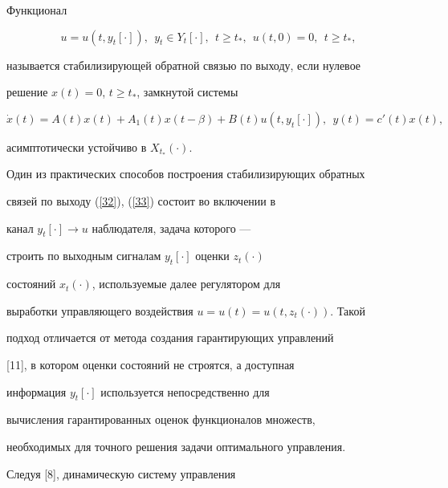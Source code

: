 \begin{defns}


Функционал


\begin{equation}\label{32}


u=u(t,y_t[\cdot]),\ \ y_t \in Y_t[\cdot],


\ \ t \ge t_*,\ \ u(t,0)=0,\ \ t \ge t_*,


\end{equation}


называется стабилизирующей обратной связью по выходу, если нулевое


решение $x(t)=0$, $t \ge t_*$, замкнутой системы


\begin{equation}\label{33}


\Dot x(t)=A(t)x(t)+A_1(t)x(t-\beta)+B(t)u(t,y_t[\cdot]),


\ \ y(t)=c'(t)x(t),


\end{equation}


асимптотически устойчиво в $X_{t_*}(\cdot)$.


\end{defns}





Один из практических способов построения стабилизирующих обратных


связей по выходу (\ref{32}), (\ref{33}) состоит во включении в


канал $y_t[\cdot] \rightarrow u$ наблюдателя, задача которого ---


строить по выходным сигналам $y_t[\cdot]$ оценки $z_t(\cdot)$


состояний $x_t(\cdot)$, используемые далее регулятором для


выработки управляющего воздействия $u=u(t)=u(t,z_t(\cdot))$. Такой


подход отличается от метода создания гарантирующих управлений


[11], в котором оценки состояний не строятся, а доступная


информация $y_t[\cdot]$ используется непосредственно для


вычисления гарантированных оценок функционалов множеств,


необходимых для точного решения задачи оптимального управления.





Следуя [8], динамическую систему управления


